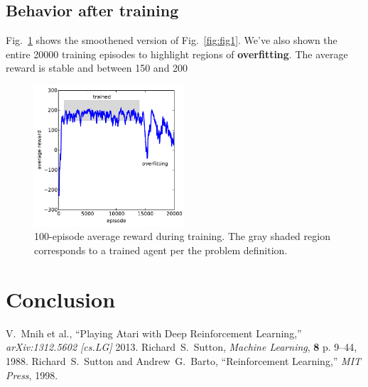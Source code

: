\documentclass[conference]{IEEEtran}
\begin{document}
\subsection{Behavior after training}
Fig.~\ref{fig:fig2} shows the smoothened version of Fig.~\ref{fig:fig1}. We've also shown the entire 20000 training episodes to highlight regions of {\bf overfitting}. The average reward is stable and between 150 and 200  
\begin{figure}[tbp]
    \centering
    \includegraphics[width=0.5\textwidth]{./figures/fig2.pdf}
    \caption{100-episode average reward during training. The gray shaded region corresponds to a trained agent per the problem definition. \label{fig:fig2}}
\end{figure}
\section*{Conclusion}
 
\begin{thebibliography}{1}
V.~Mnih et al., ``Playing Atari with Deep Reinforcement Learning,'' {\em arXiv:1312.5602 [cs.LG]} 2013.
Richard~S.~Sutton, {\em Machine Learning}, {\bf 8} p. 9--44, 1988.
Richard~S.~Sutton and Andrew~G.~Barto, ``Reinforcement Learning,'' {\em MIT Press}, 1998.
\end{thebibliography}
\end{document}

